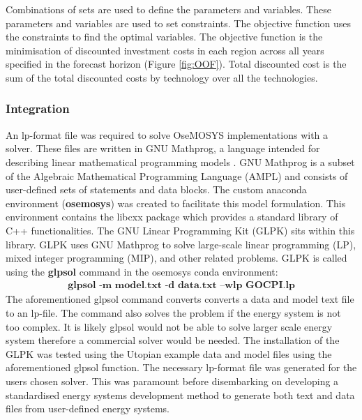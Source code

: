 \documentclass[12pt]{article}
\begin{document}
Combinations of sets are used to define the parameters and variables.
These parameters and variables are used to set constraints. 
The objective function uses the constraints to find the optimal variables.
The objective function is the minimisation of discounted investment costs in each region across all years specified in the forecast horizon (Figure \ref{fig:OOF}).
Total discounted cost is the sum of the total discounted costs by technology over all the technologies.

\subsubsection{Integration}

An lp-format file was required to solve OseMOSYS implementations with a solver.
These files are written in GNU Mathprog, a language intended for describing linear mathematical programming models \cite{GNU_Mathprog}. 
GNU Mathprog is a subset of the Algebraic Mathematical Programming Language (AMPL) \cite{AMPL} and consists of user-defined sets of statements and data blocks.
The custom anaconda environment (\textbf{osemosys}) was created to facilitate this model formulation. This environment contains the libcxx package which provides a standard library of C++ functionalities.
The GNU Linear Programming Kit (GLPK) sits within this library. GLPK uses GNU Mathprog to solve large-scale linear programming (LP), mixed integer programming (MIP), and other related problems. 
GLPK is called using the \textbf{glpsol} command in the osemosys conda environment:
\begin{align*}	
	\textbf{glpsol -m model.txt -d data.txt --wlp GOCPI.lp}
\end{align*}
The aforementioned glpsol command converts converts a data and model text file to an lp-file. 
The command also solves the problem if the energy system is not too complex.
It is likely glpsol would not be able to solve larger scale energy system therefore a commercial solver would be needed.
The installation of the GLPK was tested using the Utopian example data and model files using the aforementioned glpsol function.
The necessary lp-format file was generated for the users chosen solver. 
This was paramount before disembarking on developing a standardised energy systems development method to generate both text and data files from user-defined energy systems.
\end{document}
